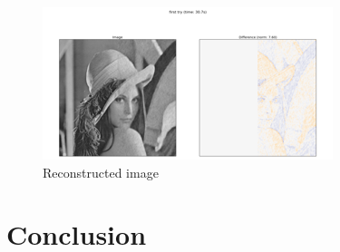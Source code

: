 \documentclass[10pt]{beamer}
\begin{document}
\begin{frame}
	\begin{figure}[h!]
		\centering
		\includegraphics[width = 0.8\linewidth]{lena_reconstructed.png}
		\caption{Reconstructed image}
	\end{figure}
\end{frame}




\section{Conclusion}
\end{document}
